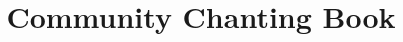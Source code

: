 \documentclass[
  babelLanguage=english,
  final,
]{chantingbook}
\title{Community Chanting Book}
\begin{document}


\frontmatter

\cleartorecto
\tableofcontents*

\mainmatter



%
\end{document}
